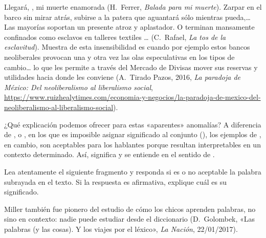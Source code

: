 \begin{exe}
  \ex\label{ex:01-mente-nombres}
    \begin{xlist}
      \ex Llegará, , mi muerte enamorada (H.~Ferrer,
          \textit{Balada para mi muerte}).
      \ex Zarpar en el barco sin mirar atrás, subirse a la patera que aguantará
          sólo mientras pueda,\ldots{} Las mayorías soportan
           un presente atroz y aplastador. O
          terminan mansamente confinados como esclavos en talleres textiles
          \ldots{} (C.~Rafael, \textit{La tos de la
          esclavitud}).
      \ex Muestra de esta insensibilidad es cuando por ejemplo estos bancos
          neoliberales provocan una y otra vez las olas especulativas en los
          tipos de cambio\ldots{} lo que les permite a través del Mercado de
          Divisas mover sus reservas y utilidades hacia donde
           les conviene (A.~Tirado Pazos, 2016,
          \textit{La paradoja de México: Del neoliberalismo al liberalismo
          social},
          \url{https://www.ruizhealytimes.com/economia-y-negocios/la-paradoja-de-mexico-del-neoliberalismo-al-liberalismo-social}).
    \end{xlist}
\end{exe}

¿Qué explicación podemos ofrecer para estas «aparentes» anomalías? A diferencia
de , 
o , en los que es imposible asignar
significado al conjunto (), los
ejemplos de , en cambio, son aceptables para los
hablantes porque resultan interpretables en un contexto determinado. Así,
 significa  y
 se entiende en el sentido de .

\begin{ejercicio}\label{ej:01-diccionariamente}
Lea atentamente el siguiente fragmento y responda si es o no aceptable la
palabra subrayada en el texto. Si la respuesta es afirmativa, explique cuál es
su significado.

\begin{cita}
Miller también fue pionero del estudio de cómo los chicos aprenden palabras,
no  sino en contexto: nadie puede estudiar desde el
diccionario (D.~Golombek, «Las palabras (y las cosas). Y los viajes por el
léxico», \textit{La Nación}, 22/01/2017).
\end{cita}
\end{ejercicio}

